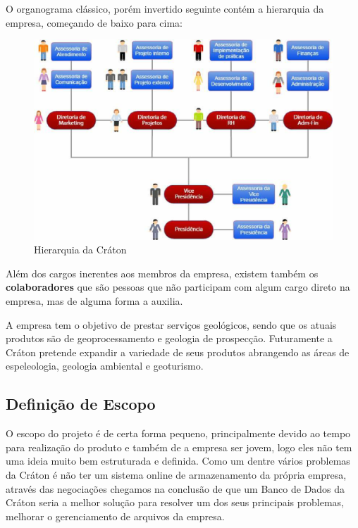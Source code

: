   O organograma clássico, porém invertido seguinte contém a hierarquia da empresa, começando
  de baixo para cima:

  \begin{figure}[!ht]
    \centering
    \includegraphics[width=15cm, keepaspectratio=true]{figuras/empresa/hierarquia-craton.eps}
    \caption{Hierarquia da Cráton}
  \end{figure}

  Além dos cargos inerentes aos membros da empresa, existem também os \textbf{colaboradores}
  que são pessoas que não participam com algum cargo direto na empresa, mas de alguma forma
  a auxilia.

  A empresa tem o objetivo de prestar serviços geológicos, sendo que os atuais produtos são
  de geoprocessamento e geologia de prospecção. Futuramente a Cráton pretende expandir a
  variedade de seus produtos abrangendo as áreas de espeleologia, geologia ambiental e
  geoturismo.

\subsection{Definição de Escopo}

  O escopo do projeto é de certa forma pequeno, principalmente devido ao tempo para realização do produto e também de a empresa ser jovem,
  logo eles não tem uma ideia muito bem estruturada e definida. Como um dentre vários problemas da Cráton é não ter um sistema online de
  armazenamento da própria empresa, através das negociações chegamos na conclusão de que um Banco de Dados da Cráton seria a melhor
  solução para resolver um dos seus principais problemas, melhorar o gerenciamento de arquivos da empresa.

